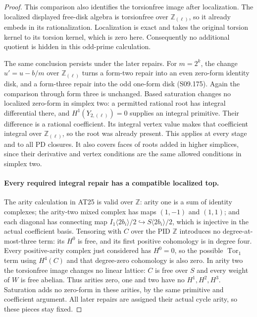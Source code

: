 \begin{proof}
This comparison also identifies the torsionfree image after
localization. The localized displayed free-disk algebra is
torsionfree over $\mathbb Z_{(\ell)}$, so it already embeds
in its rationalization. Localization is exact and takes the
original torsion kernel to its torsion kernel, which is zero
here. Consequently no additional quotient is hidden in this
odd-prime calculation.

The same conclusion persists under the later repairs. For
$m=2^k$, the change $u'=u-b/m$ over $\mathbb Z_{(\ell)}$
turns a form-two repair into an even zero-form identity disk,
and a form-three repair into the odd one-form disk (S09.175).
Again the comparison through form three is unchanged.
Based saturation changes no localized zero-form in simplex
two: a permitted rational root has integral differential
there, and $H^1(Y_{2,(\ell)})=0$ supplies an integral primitive.
Their difference is a rational coefficient. Its integral
vertex value makes that coefficient integral over
$\mathbb Z_{(\ell)}$, so the root was already present.
This applies at every stage and to all PD closures.
It also covers faces of roots added in higher simplices,
since their derivative and vertex conditions are the same
allowed conditions in simplex two.

\paragraph{Every required integral repair has a compatible localized top.}
The arity calculation in AT25 is valid over $\mathbb Z$:
arity one is a sum of identity complexes; the arity-two
mixed complex has maps $(1,-1)$ and $(1,1)$; and each
diagonal has connecting map
$I_1\langle2b_i\rangle/2\hookrightarrow
S\langle2b_i\rangle/2$, which is injective in the actual
coefficient basis. Tensoring with $C$ over the PID $\mathbb Z$
introduces no degree-at-most-three term: its $H^0$ is free,
and its first positive cohomology is in degree four. Every
positive-arity complex just considered has $H^0=0$, so
the possible $\operatorname{Tor}_1$ term using $H^4(C)$
and that degree-zero cohomology is also zero. In arity two
the torsionfree image changes no linear lattice: $C$ is
free over $S$ and every weight of $W$ is free abelian.
Thus arities zero, one and two have no $H^1,H^2,H^3$.
Saturation adds no zero-form in these arities, by the same
primitive and coefficient argument. All later repairs are
assigned their actual cycle arity, so these pieces stay fixed.


\end{proof}
